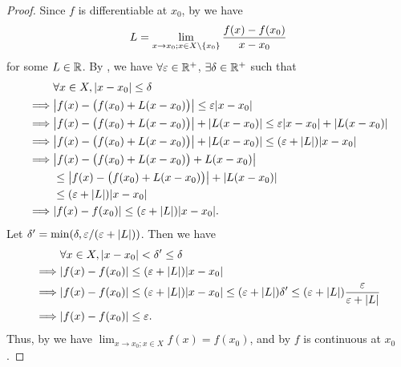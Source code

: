 \begin{proof}
  Since \(f\) is differentiable at \(x_0\), by  we have
  \[
    L = \lim_{x \to x_0 ; x \in X \setminus \left\lbrace x_0\right\rbrace} \dfrac{f(x) - f(x_0)}{x - x_0}
  \]
  for some \(L \in \mathbb{R}\).
  By , we have \(\forall \varepsilon \in \mathbb{R}^+\), \(\exists \delta \in \mathbb{R}^+\) such that
  \begin{align*}
             & \forall x \in X, \abs{x - x_0} \leq \delta                                                                      \\
    \implies & \abs{f(x) - \big(f(x_0) + L(x - x_0)\big)} \leq \varepsilon \abs{x - x_0}                                       \\
    \implies & \abs{f(x) - \big(f(x_0) + L(x - x_0)\big)} + \abs{L(x - x_0)} \leq \varepsilon \abs{x - x_0} + \abs{L(x - x_0)} \\
    \implies & \abs{f(x) - \big(f(x_0) + L(x - x_0)\big)} + \abs{L(x - x_0)} \leq (\varepsilon + \abs{L}) \abs{x - x_0}        \\
    \implies & \abs{f(x) - \big(f(x_0) + L(x - x_0)\big) + L(x - x_0)}                                                         \\
             & \leq \abs{f(x) - \big(f(x_0) + L(x - x_0)\big)} + \abs{L(x - x_0)}                                              \\
             & \leq (\varepsilon + \abs{L}) \abs{x - x_0}                                                                      \\
    \implies & \abs{f(x) - f(x_0)} \leq (\varepsilon + \abs{L}) \abs{x - x_0}.
  \end{align*}
  Let \(\delta' = \min(\delta, \varepsilon / (\varepsilon + \left\lvert L\right\rvert))\).
  Then we have
  \begin{align*}
             & \forall x \in X, \abs{x - x_0} < \delta' \leq \delta                                                                                                                        \\
    \implies & \abs{f(x) - f(x_0)} \leq (\varepsilon + \abs{L}) \abs{x - x_0}                                                                                                              \\
    \implies & \abs{f(x) - f(x_0)} \leq (\varepsilon + \abs{L}) \abs{x - x_0} \leq (\varepsilon + \abs{L}) \delta' \leq (\varepsilon + \abs{L}) \dfrac{\varepsilon}{\varepsilon + \abs{L}} \\
    \implies & \abs{f(x) - f(x_0)} \leq \varepsilon.
  \end{align*}
  Thus, by  we have \(\lim_{x \to x_0 ; x \in X} f(x) = f(x_0)\), and by  \(f\) is continuous at \(x_0\).
\end{proof}

